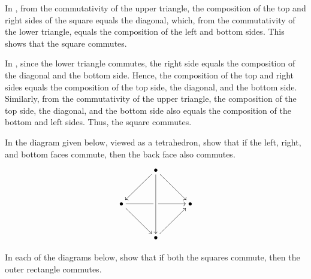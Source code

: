 \begin{Solution*}
In , from the commutativity of the upper triangle, the composition of the top and right sides of the square equals the diagonal, which, from the commutativity of the lower triangle, equals the composition of the left and bottom sides. This shows that the square commutes.

In , since the lower triangle commutes, the right side equals the composition of the diagonal and the bottom side. Hence, the composition of the top and right sides equals the composition of the top side, the diagonal, and the bottom side. Similarly, from the commutativity of the upper triangle, the composition of the top side, the diagonal, and the bottom side also equals the composition of the bottom and left sides. Thus, the square commutes.
\end{Solution*}


\begin{Exercise}
In the diagram given below, viewed as a tetrahedron, show that if the left, right, and bottom faces commute, then the back face also commutes.
\begin{equation*}
\xymatrix@=3em{
& \bullet \ar[ld] \ar[dd] \ar[rd] & \\
\bullet \ar[rd] \ar[rr]|\hole & & \bullet \\
& \bullet \ar[ru] &
}
\end{equation*}
\end{Exercise}

\begin{Exercise}
In each of the diagrams below, show that if both the squares commute, then the outer rectangle commutes.
\begin{figure}[H]
\centering
\subcaptionbox{}{$\xymatrix@=3em{
\bullet \ar[r] \ar[d] & \bullet \ar[r] \ar[d] & \bullet \ar[d] \\
\bullet \ar[r] & \bullet \ar[r] & \bullet
}$}
\hspace{0.1\textwidth}
\subcaptionbox{}{$\xymatrix@=3em{
\bullet \ar[r] \ar[d] & \bullet \ar[r] \ar[d] & \bullet \\
\bullet \ar[r] & \bullet \ar[r] & \bullet \ar[u]
}$}
\hspace{0.1\textwidth}
\subcaptionbox{}{$\xymatrix@=3em{
\bullet \ar[r] \ar[d] & \bullet \ar[r] & \bullet \ar[d] \\
\bullet \ar[r] & \bullet \ar[r] \ar[u] & \bullet
}$}
\end{figure}
\end{Exercise}


